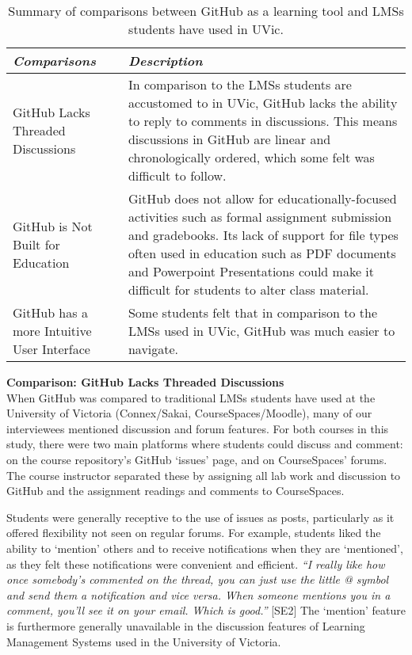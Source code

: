 \begin{table}[h]
    \vspace{1pt}
        \caption{Summary of comparisons between GitHub as a learning tool and LMSs students have used in UVic.}\label{table:interviews:students:comparison}
    \vspace{1pt}
    \begin{center}
        \begin{tabular}{ | m{3cm} | m{12cm} | }
            \hline
            \emph{Comparisons} & \emph{Description} \\
            \hline
            GitHub Lacks Threaded Discussions & In comparison to the LMSs students are accustomed to in UVic, GitHub lacks the ability to reply to comments in discussions. This means discussions in GitHub are linear and chronologically ordered, which some felt was difficult to follow. \\
            \hline
            GitHub is Not Built for Education & GitHub does not allow for educationally-focused activities such as formal assignment submission and gradebooks. Its lack of support for file types often used in education such as PDF documents and Powerpoint Presentations could make it difficult for students to alter class material. \\
            \hline
            GitHub has a more Intuitive User Interface & Some students felt that in comparison to the LMSs used in UVic, GitHub was much easier to navigate. \\
            \hline
        \end{tabular}
    \end{center}
\end{table}

\textbf{Comparison: GitHub Lacks Threaded Discussions} \\
When GitHub was compared to traditional LMSs students have used at the University of Victoria (Connex/Sakai, CourseSpaces/Moodle), many of our interviewees mentioned discussion and forum features. For both courses in this study, there were two main platforms where students could discuss and comment: on the course repository's GitHub `issues' page, and on CourseSpaces' forums. The course instructor separated these by assigning all lab work and discussion to GitHub and the assignment readings and comments to CourseSpaces.

Students were generally receptive to the use of issues as posts, particularly as it offered flexibility not seen on regular forums. For example, students liked the ability to `mention' others and to receive notifications when they are `mentioned', as they felt these notifications were convenient and efficient. \textit{``I really like how once somebody's commented on the thread, you can just use the little @ symbol and send them a notification and vice versa. When someone mentions you in a comment, you'll see it on your email. Which is good.''} [SE2] The `mention' feature is furthermore generally unavailable in the discussion features of Learning Management Systems used in the University of Victoria.

